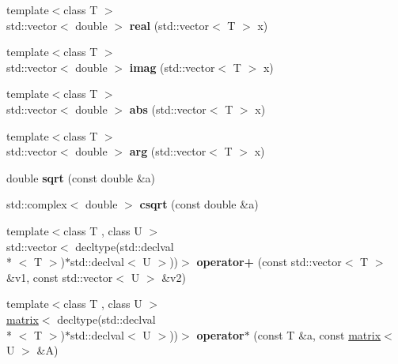 \begin{DoxyCompactItemize}
\item 
\hypertarget{namespacekeycpp_a76cd22caf522d677271fb915fb3aec37}{{\footnotesize template$<$class T $>$ }\\std\-::vector$<$ double $>$ {\bfseries real} (std\-::vector$<$ T $>$ x)}\label{namespacekeycpp_a76cd22caf522d677271fb915fb3aec37}

\item 
\hypertarget{namespacekeycpp_a22cc33e0299a65158c81352603bcd35a}{{\footnotesize template$<$class T $>$ }\\std\-::vector$<$ double $>$ {\bfseries imag} (std\-::vector$<$ T $>$ x)}\label{namespacekeycpp_a22cc33e0299a65158c81352603bcd35a}

\item 
\hypertarget{namespacekeycpp_a01edbbe2645ae65b6ec2c08b2d4352e4}{{\footnotesize template$<$class T $>$ }\\std\-::vector$<$ double $>$ {\bfseries abs} (std\-::vector$<$ T $>$ x)}\label{namespacekeycpp_a01edbbe2645ae65b6ec2c08b2d4352e4}

\item 
\hypertarget{namespacekeycpp_a70d66686c6b209cc8eb64f84977544da}{{\footnotesize template$<$class T $>$ }\\std\-::vector$<$ double $>$ {\bfseries arg} (std\-::vector$<$ T $>$ x)}\label{namespacekeycpp_a70d66686c6b209cc8eb64f84977544da}

\item 
\hypertarget{namespacekeycpp_a2d204e24f675e0576a882e3069939bee}{double {\bfseries sqrt} (const double \&a)}\label{namespacekeycpp_a2d204e24f675e0576a882e3069939bee}

\item 
\hypertarget{namespacekeycpp_a952e5296774667c3be4e792b5cd980da}{std\-::complex$<$ double $>$ {\bfseries csqrt} (const double \&a)}\label{namespacekeycpp_a952e5296774667c3be4e792b5cd980da}

\item 
\hypertarget{namespacekeycpp_a4da6882977b2262f8d6f080b0eaf60c5}{{\footnotesize template$<$class T , class U $>$ }\\std\-::vector$<$ decltype(std\-::declval\\*
$<$ T $>$)$\ast$std\-::declval$<$ U $>$))$>$ {\bfseries operator+} (const std\-::vector$<$ T $>$ \&v1, const std\-::vector$<$ U $>$ \&v2)}\label{namespacekeycpp_a4da6882977b2262f8d6f080b0eaf60c5}

\item 
\hypertarget{namespacekeycpp_a8d5dbf37b71d16d686dd0fdbad82f8fb}{{\footnotesize template$<$class T , class U $>$ }\\\hyperlink{classkeycpp_1_1matrix}{matrix}$<$ decltype(std\-::declval\\*
$<$ T $>$)$\ast$std\-::declval$<$ U $>$))$>$ {\bfseries operator$\ast$} (const T \&a, const \hyperlink{classkeycpp_1_1matrix}{matrix}$<$ U $>$ \&A)}\label{namespacekeycpp_a8d5dbf37b71d16d686dd0fdbad82f8fb}


\end{DoxyCompactItemize}
